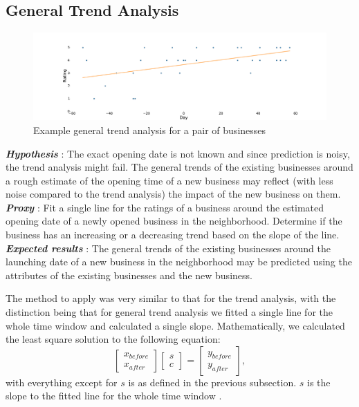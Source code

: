 \documentclass{vldb}
\begin{document}
\subsection*{General Trend Analysis}

\begin{figure}[h]
\centering
\includegraphics[width=\columnwidth]{gen_trend.pdf}
\caption{   Example general trend analysis for a pair of businesses}
\end{figure}

\textbf{\textit{Hypothesis}} : The exact opening date is not known and since prediction is noisy, the trend analysis might fail. The general trends of the existing businesses around a rough estimate of the opening time of a new business may reflect (with less noise compared to the trend analysis) the impact of the new business on them.\\
\textbf{\textit{Proxy}} : Fit a single line for the ratings of a business around the estimated opening date of a newly opened business in the neighborhood. Determine if the business has an increasing or a decreasing trend based on the slope of the line.\\
\textbf{\textit{Expected results}} : The general trends of the existing businesses around the launching date of a new business in the neighborhood may be predicted using the attributes of the existing businesses and the new business. 

The method to apply was very similar to that for the trend analysis, with the distinction being that for general trend analysis we fitted a single line for the whole time window and calculated a single slope. Mathematically, we calculated the least square solution to the following equation:
\begin{equation*}
 \left [\begin{array}{c}x_{before} \\ x_{after}  \end{array} \right ] 
  \left [\begin{array}{c}s \\ c \end{array} \right ] 
 =  \left [\begin{array}{c}y_{before} \\ y_{after} \end{array} \right ] ,
\end{equation*}
with everything except for $s$ is as defined in the previous subsection. $s$ is the slope to the fitted line for the whole time window .
\end{document}

